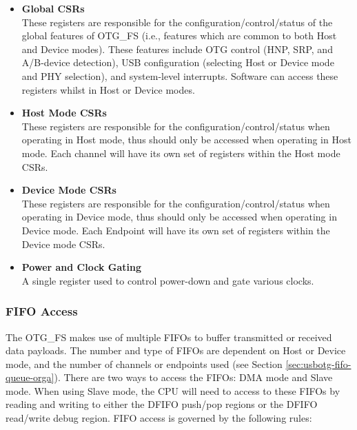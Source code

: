 \documentclass[main\_\_EN.tex]{subfiles}
\begin{document}
\begin{itemize}
    \item {\bfseries Global CSRs}\\
    These registers are responsible for the configuration/control/status of the global features of OTG\_FS (i.e., features which are common to both Host and Device modes). These features include OTG control (HNP, SRP, and A/B-device detection), USB configuration (selecting Host or Device mode and PHY selection), and system-level interrupts. Software can access these registers whilst in Host or Device modes.

    \item {\bfseries Host Mode CSRs}\\
    These registers are responsible for the configuration/control/status when operating in Host mode, thus should only be accessed when operating in Host mode. Each channel will have its own set of registers within the Host mode CSRs.

    \item {\bfseries Device Mode CSRs}\\
    These registers are responsible for the configuration/control/status when operating in Device mode, thus should only be accessed when operating in Device mode. Each Endpoint will have its own set of registers within the Device mode CSRs.

    \item {\bfseries Power and Clock Gating}\\
    A single register used to control power-down and gate various clocks.
\end{itemize}

\subsubsection{FIFO Access}

The OTG\_FS makes use of multiple FIFOs to buffer transmitted or received data payloads. The number and type of FIFOs are dependent on Host or Device mode, and the number of channels or endpoints used (see Section \ref{sec:usbotg-fifo-queue-orga}). There are two ways to access the FIFOs: DMA mode and Slave mode. When using Slave mode, the CPU will need to access to these FIFOs by reading and writing to either the DFIFO push/pop regions or the DFIFO read/write debug region. FIFO access is governed by the following rules:
\end{document}
